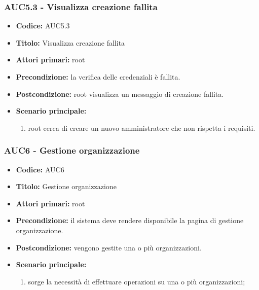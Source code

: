 \documentclass[casi-duso]{subfiles}
\begin{document}
\subsubsection{AUC5.3 - Visualizza creazione fallita}%
\label{subsub:AUC5.3}
\begin{itemize}
  \item \textbf{Codice:} AUC5.3
  \item \textbf{Titolo:} Visualizza creazione fallita
  \item \textbf{Attori primari:} root
  \item \textbf{Precondizione:} la verifica delle credenziali è fallita.
  \item \textbf{Postcondizione:} root visualizza un messaggio di creazione fallita.
  \item \textbf{Scenario principale:}
  \begin{enumerate}
    \item root cerca di creare un nuovo amministratore che non rispetta i requisiti.
  \end{enumerate}
\end{itemize}

\subsubsection{AUC6 - Gestione organizzazione}%
\label{subsub:AUC6}
\begin{itemize}
  \item \textbf{Codice:} AUC6
  \item \textbf{Titolo:} Gestione organizzazione
  \item \textbf{Attori primari:} root
  \item \textbf{Precondizione:} il sistema deve rendere disponibile la pagina di gestione organizzazione.
  \item \textbf{Postcondizione:} vengono gestite una o più organizzazioni.
  \item \textbf{Scenario principale:}
  \begin{enumerate}
    \item sorge la necessità di effettuare operazioni su una o più organizzazioni;
  \end{enumerate}
\end{itemize}
\end{document}
